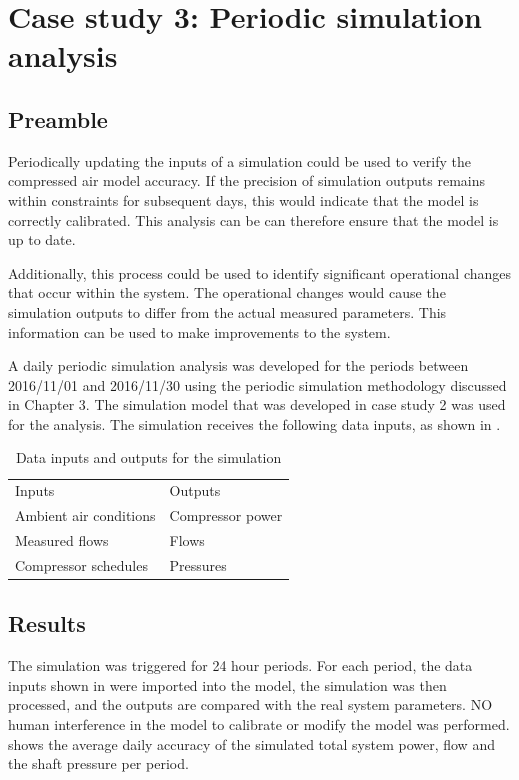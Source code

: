 \section{Case study 3: Periodic simulation analysis}
	\subsection{Preamble}
	Periodically updating the inputs of a simulation could be used to verify the compressed air model accuracy. If the precision of simulation outputs remains within constraints for subsequent days, this would indicate that the model is correctly calibrated. This analysis can be can therefore ensure that the model is up to date.
	\par 
	 Additionally, this process could be used to identify significant operational changes that occur within the system. The operational changes would cause the simulation outputs to differ from the actual measured parameters. This information can be used to make improvements to the system.
	\par 
	A daily periodic simulation analysis was developed for the periods between 2016/11/01 and 2016/11/30 using the periodic simulation methodology discussed in Chapter 3. The simulation model that was developed in case study 2 was used for the analysis. The simulation receives the following data inputs, as shown in .
	\begin{table}[h!]
		\centering
		\begin{tabular}{ll}
			\hline
			Inputs \hspace*{4cm} &Outputs \hspace*{4cm} \\ \hhline{==}
			Ambient air conditions&Compressor power \\
			Measured flows& Flows \\
			Compressor schedules& Pressures \\
			\hline
		\end{tabular}
		\caption{Data inputs and outputs for the simulation}
		\label{table: Periodic inputs/outputs}
	\end{table}

\subsection{Results}

 The simulation was triggered for 24 hour periods. For each period, the data inputs shown in  were imported into the model, the simulation was then processed, and the outputs are compared with the real system parameters. NO human interference in the model to calibrate or modify the model was performed.  shows the average daily accuracy of the simulated total system power, flow and the shaft pressure per period.
	 \par 
 
